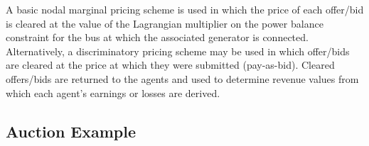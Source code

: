 
A basic nodal marginal pricing scheme is used in which the price of each
offer/bid is cleared at the value of the Lagrangian multiplier on the power
balance constraint for the bus at which the associated generator is connected.
Alternatively, a discriminatory pricing scheme may be used in which offer/bids
are cleared at the price at which they were submitted (pay-as-bid). Cleared
offers/bids are returned to the agents and used to determine revenue values
from which each agent's earnings or losses are derived.

\subsection{Auction Example}
%
